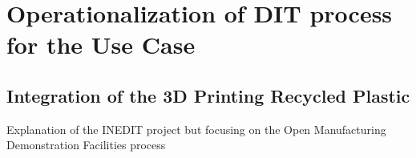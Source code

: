 \documentclass[
  11pt,
]{article}
\begin{document}
\hypertarget{operationalization-of-dit-process-for-the-use-case}{%
\section{Operationalization of DIT process for the Use
Case}\label{operationalization-of-dit-process-for-the-use-case}}

\hypertarget{integration-of-the-3d-printing-recycled-plastic}{%
\subsection{Integration of the 3D Printing Recycled
Plastic}\label{integration-of-the-3d-printing-recycled-plastic}}

Explanation of the INEDIT project but focusing on the Open Manufacturing
Demonstration Facilities process
\end{document}
